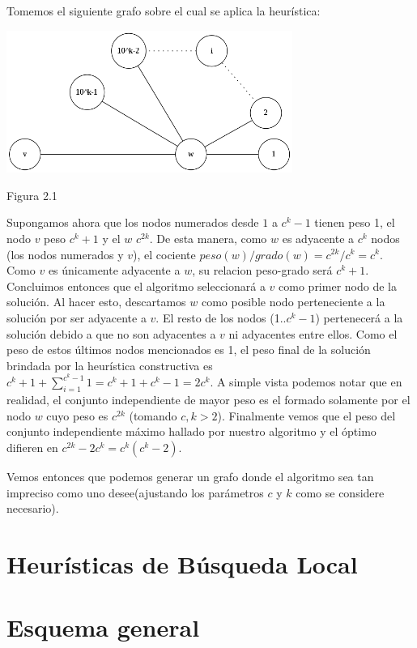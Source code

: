 \documentclass[a4paper,11pt] {article}
\begin{document}
Tomemos el siguiente grafo sobre el cual se aplica la heur\'istica:

\begin{center}
\includegraphics[width=0.7\textwidth]{graficos/casoMaloHC.png}
\begin{center}
Figura 2.1
\end{center}
\end{center}

Supongamos ahora que los nodos numerados desde $1$ a $c^{k}-1$ tienen peso 1, el nodo $v$ peso $c^{k}+1$ y el $w$ $c^{2k}$. De esta manera, como $w$ es adyacente a $c^{k}$ nodos (los nodos numerados y $v$), el cociente $peso(w)/grado(w)=c^{2k}/c^{k}=c^{k}$. Como $v$ es \'unicamente adyacente a $w$, su relacion peso-grado ser\'a $c^{k}+1$. Concluimos entonces que el algoritmo seleccionar\'a a $v$ como primer nodo de la soluci\'on. Al hacer esto, descartamos $w$ como posible nodo perteneciente a la soluci\'on por ser adyacente a $v$. El resto de los nodos (1..$c^{k}-1$) pertenecer\'a a la soluci\'on debido a que no son adyacentes a $v$ ni adyacentes entre ellos. Como el peso de estos \'ultimos nodos mencionados es 1, el peso final de la soluci\'on brindada por la heur\'istica constructiva es $c^{k}+1+\sum_{i=1}^{c^{k}-1}1=c^{k}+1+c^{k}-1=2c^{k}$. A simple vista podemos notar que en realidad, el conjunto independiente de mayor peso es el formado solamente por el nodo $w$ cuyo peso es $c^{2k}$ (tomando $c,k>2$). Finalmente vemos que el peso del conjunto independiente m\'aximo hallado por nuestro algoritmo y el \'optimo difieren en $c^{2k}-2c^{k}=c^{k}(c^{k}-2)$.

Vemos entonces que podemos generar un grafo donde el algoritmo sea tan impreciso como uno desee(ajustando los par\'ametros $c$ y $k$ como se considere necesario).

\bigskip
\section{Heur\'isticas de B\'usqueda Local}

\section*{Esquema general}
\end{document}
